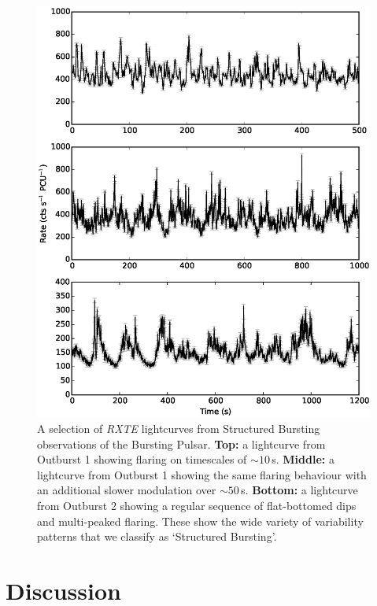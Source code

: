 \begin{figure}
  \centering
  \includegraphics[width=.9\linewidth, trim={0.8cm 0 1.5cm 0},clip]{images/many_struc.eps}
  \caption{\small A selection of \textit{RXTE} lightcurves from Structured Bursting observations of the Bursting Pulsar.  \textbf{Top:} a lightcurve from Outburst 1 showing flaring on timescales of $\sim10$\,s.  \textbf{Middle:} a lightcurve from Outburst 1 showing the same flaring behaviour with an additional slower modulation over $\sim50$\,s.  \textbf{Bottom:} a lightcurve from Outburst 2 showing a regular sequence of flat-bottomed dips and multi-peaked flaring.  These show the wide variety of variability patterns that we classify as `Structured Bursting'.}
  \label{fig:Types_Struc}
\end{figure}

\section{Discussion}

